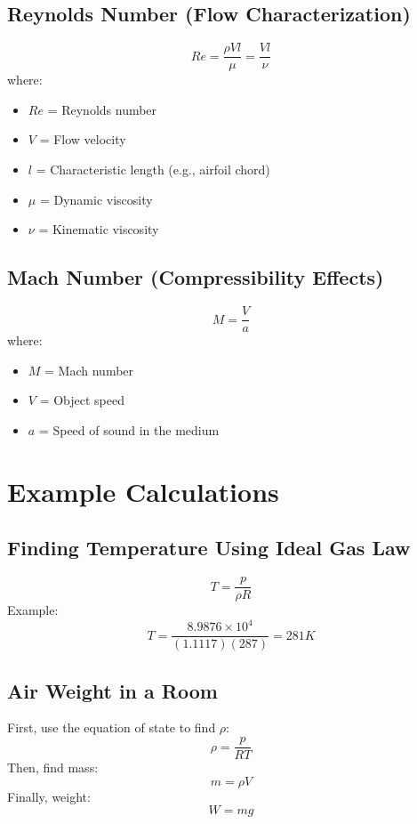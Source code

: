 \documentclass{article}
\begin{document}
\subsection{Reynolds Number (Flow Characterization)}
\begin{equation}
    Re = \frac{\rho V l}{\mu} = \frac{V l}{\nu}
\end{equation}
where:
\begin{itemize}
    \item $Re$ = Reynolds number
    \item $V$ = Flow velocity
    \item $l$ = Characteristic length (e.g., airfoil chord)
    \item $\mu$ = Dynamic viscosity
    \item $\nu$ = Kinematic viscosity
\end{itemize}

\subsection{Mach Number (Compressibility Effects)}
\begin{equation}
    M = \frac{V}{a}
\end{equation}
where:
\begin{itemize}
    \item $M$ = Mach number
    \item $V$ = Object speed
    \item $a$ = Speed of sound in the medium
\end{itemize}

\section{Example Calculations}

\subsection{Finding Temperature Using Ideal Gas Law}
\begin{equation}
    T = \frac{p}{\rho R}
\end{equation}
Example:
\begin{equation}
    T = \frac{8.9876 \times 10^4}{(1.1117)(287)} = 281K
\end{equation}

\subsection{Air Weight in a Room}
First, use the equation of state to find $\rho$:
\begin{equation}
    \rho = \frac{p}{RT}
\end{equation}
Then, find mass:
\begin{equation}
    m = \rho V
\end{equation}
Finally, weight:
\begin{equation}
    W = mg
\end{equation}
\end{document}
